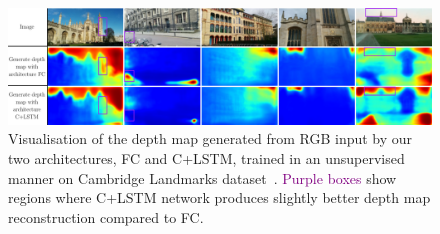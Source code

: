 \begin{figure}
    \centering
	\includegraphics[width=\linewidth]{results/outdoor/depth_maps}
	\caption[Generated outdoor depth maps]{\label{fig:depth_map_outdoor} Visualisation of the depth map generated from RGB input by our two architectures, FC and C+LSTM, trained in an unsupervised manner on Cambridge Landmarks dataset~\citep{Kendall2015}. \textcolor{purple}{Purple boxes} show regions where C+LSTM network produces slightly better depth map reconstruction compared to FC.}
\end{figure}